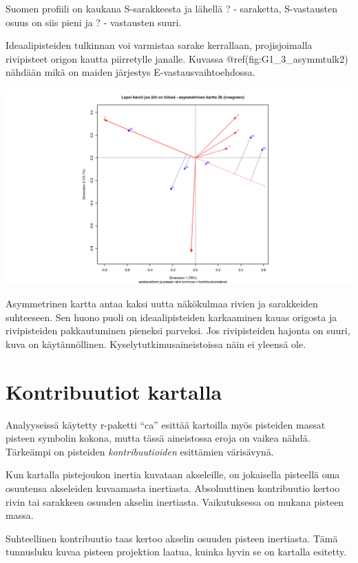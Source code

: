 \documentclass[
  finnish,
]{book}
\begin{document}
Suomen profiili on kaukana S-sarakkeesta ja lähellä ? - saraketta, S-vastausten
osuus on siis pieni ja ? - vastausten suuri.

Ideaalipisteiden tulkinnan voi varmistaa sarake kerrallaan, projisjoimalla rivipisteet
origon kautta piirretylle janalle. Kuvassa @ref(fig:G1\_3\_asymmtulk2) nähdään mikä
on maiden järjestys E-vastausvaihtoehdossa.

\begin{center}\includegraphics[width=0.9\linewidth]{img/simpleCAasymmTulk2} \end{center}

Asymmetrinen kartta antaa kaksi uutta näkökulmaa rivien ja sarakkeiden suhteeseen.
Sen huono puoli on ideaalipisteiden karkaaminen kauas origosta ja rivipisteiden
pakkautuminen pieneksi parveksi. Jos rivipisteiden hajonta on suuri,
kuva on käytännöllinen. Kyselytutkimusaineistoissa näin ei yleensä ole.

\hypertarget{kontribuutiot-kartalla}{%
\section{Kontribuutiot kartalla}\label{kontribuutiot-kartalla}}

Analyyseissä käytetty r-paketti ``ca'' esittää kartoilla myös pisteiden massat pisteen
symbolin kokona, mutta tässä aineistossa eroja on vaikea nähdä. Tärkeämpi on pisteiden
\emph{kontribuutioiden} esittämien värisävynä.

Kun kartalla pistejoukon inertia kuvataan akseleille, on jokaisella pisteellä oma
osuutensa akseleiden kuvaamasta inertiasta. Absoluuttinen kontribuutio kertoo rivin
tai sarakkeen osuuden akselin inertiasta. Vaikutuksessa on mukana pisteen massa.

Suhteellinen kontribuutio taas kertoo akselin osuuden pisteen inertiasta.
Tämä tunnusluku kuvaa pisteen projektion laatua, kuinka hyvin se on kartalla esitetty.
\end{document}
